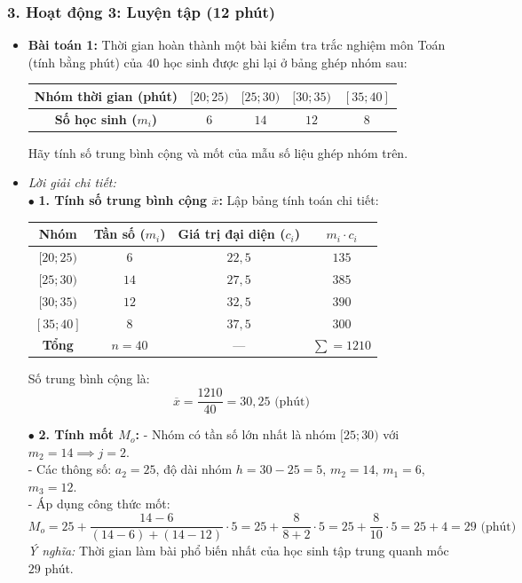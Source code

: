 \documentclass[12pt, a4paper]{article}
\begin{document}
\subsubsection*{3. Hoạt động 3: Luyện tập (12 phút)}
\begin{itemize}
    \item \textbf{Bài toán 1:} Thời gian hoàn thành một bài kiểm tra trắc nghiệm môn Toán (tính bằng phút) của $40$ học sinh được ghi lại ở bảng ghép nhóm sau:
    \begin{center}
    \begin{tabular}{|c|c|c|c|c|}
    \hline
    \textbf{Nhóm thời gian (phút)} & $[20; 25)$ & $[25; 30)$ & $[30; 35)$ & $[35; 40]$ \\
    \hline
    \textbf{Số học sinh ($m_i$)} & $6$ & $14$ & $12$ & $8$ \\
    \hline
    \end{tabular}
    \end{center}
    Hãy tính số trung bình cộng và mốt của mẫu số liệu ghép nhóm trên.
    \item \textit{Lời giải chi tiết:}\\
    $\bullet$ \textbf{1. Tính số trung bình cộng $\overline{x}$:}
    Lập bảng tính toán chi tiết:
    \begin{center}
    \begin{tabular}{|c|c|c|c|}
    \hline
    \textbf{Nhóm} & \textbf{Tần số ($m_i$)} & \textbf{Giá trị đại diện ($c_i$)} & $m_i \cdot c_i$ \\
    \hline
    $[20; 25)$ & $6$ & $22{,}5$ & $135$ \\
    $[25; 30)$ & $14$ & $27{,}5$ & $385$ \\
    $[30; 35)$ & $12$ & $32{,}5$ & $390$ \\
    $[35; 40]$ & $8$ & $37{,}5$ & $300$ \\
    \hline
    \textbf{Tổng} & $n = 40$ & --- & $\sum = 1210$ \\
    \hline
    \end{tabular}
    \end{center}
    Số trung bình cộng là:
    $$\overline{x} = \dfrac{1210}{40} = 30{,}25\text{ (phút)}$$

    $\bullet$ \textbf{2. Tính mốt $M_o$:}
    - Nhóm có tần số lớn nhất là nhóm $[25; 30)$ với $m_2 = 14 \implies j = 2$.\\
    - Các thông số: $a_2 = 25$, độ dài nhóm $h = 30 - 25 = 5$, $m_2 = 14$, $m_1 = 6$, $m_3 = 12$.\\
    - Áp dụng công thức mốt:
    $$M_o = 25 + \dfrac{14 - 6}{(14 - 6) + (14 - 12)} \cdot 5 = 25 + \dfrac{8}{8 + 2} \cdot 5 = 25 + \dfrac{8}{10} \cdot 5 = 25 + 4 = 29\text{ (phút)}$$
    \textit{Ý nghĩa:} Thời gian làm bài phổ biến nhất của học sinh tập trung quanh mốc $29$ phút.
\end{itemize}
\end{document}
